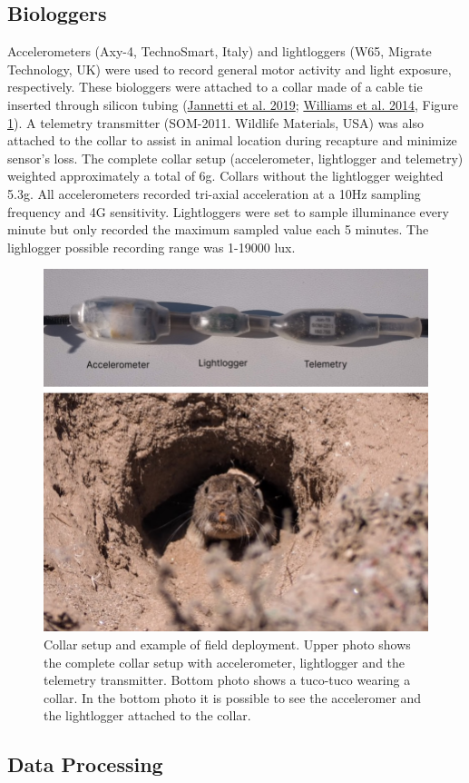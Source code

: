 \documentclass[english,msc,numbers,hidelinks]{coppe}
\begin{document}
  \hypertarget{biologgers}{%
  \subsection{Biologgers}\label{biologgers}}

  Accelerometers (Axy-4, TechnoSmart, Italy) and lightloggers (W65, Migrate Technology, UK) were used to record general motor activity and light exposure, respectively. These biologgers were attached to a collar made of a cable tie inserted through silicon tubing (\protect\hyperlink{ref-jannetti2019}{Jannetti et al. 2019}; \protect\hyperlink{ref-williams2014}{Williams et al. 2014}, Figure \ref{fig:methods-collar}). A telemetry transmitter (SOM-2011. Wildlife Materials, USA) was also attached to the collar to assist in animal location during recapture and minimize sensor's loss. The complete collar setup (accelerometer, lightlogger and telemetry) weighted approximately a total of 6g. Collars without the lightlogger weighted 5.3g. All accelerometers recorded tri-axial acceleration at a 10Hz sampling frequency and 4G sensitivity. Lightloggers were set to sample illuminance every minute but only recorded the maximum sampled value each 5 minutes. The lighlogger possible recording range was 1-19000 lux.
  \begin{figure}

  {\centering \includegraphics[width=1\linewidth]{../04_figures/collar/collar_tuco} 

  }

  \caption{Collar setup and example of field deployment. Upper photo shows the complete collar setup with accelerometer, lightlogger and the telemetry transmitter. Bottom photo shows a tuco-tuco wearing a collar. In the bottom photo it is possible to see the acceleromer and the lightlogger attached to the collar.}\label{fig:methods-collar}
  \end{figure}
  \hypertarget{data-processing}{%
  \subsection{Data Processing}\label{data-processing}}
\end{document}
